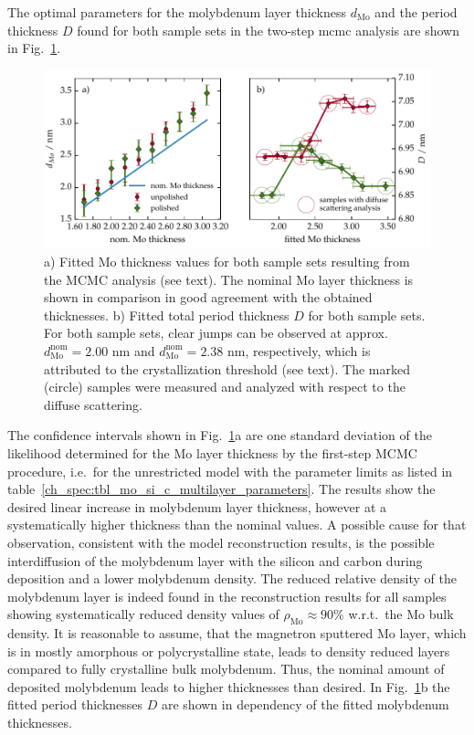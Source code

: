 The optimal parameters for the molybdenum layer thickness $d_\text{Mo}$ and the period thickness $D$ found for both sample sets in the two-step \gls{mcmc} analysis are shown in Fig.~\ref{ch_spec:fig_MoSi_fitted_mo_and_fitted_D}.
\begin{figure}[htbp]
\centering
\includegraphics[width=\textwidth]{img/fitted_mo_and_fitted_D}
\caption[Fitted Mo and period thickness values for both Mo/Si/C sample sets.]{a) Fitted Mo thickness values for both sample sets resulting from the MCMC analysis (see text). The nominal Mo layer thickness is shown in comparison in good agreement with the obtained thicknesses. b) Fitted total period thickness $D$ for both sample sets. For both sample sets, clear jumps can be observed at approx.~$d^\text{nom}_\text{Mo} =2.00$ nm and $d^\text{nom}_\text{Mo} =2.38$ nm, respectively, which is attributed to the crystallization threshold (see text). The marked (circle) samples were measured and analyzed with respect to the diffuse scattering.}
\label{ch_spec:fig_MoSi_fitted_mo_and_fitted_D}
\end{figure}
The confidence intervals shown in Fig.~\ref{ch_spec:fig_MoSi_fitted_mo_and_fitted_D}a are one standard deviation of the likelihood determined for the Mo layer thickness by the first-step MCMC procedure, i.e.~for the unrestricted model with the parameter limits as listed in table~\ref{ch_spec:tbl_mo_si_c_multilayer_parameters}. The results show the desired linear increase in molybdenum layer thickness, however at a systematically higher thickness than the nominal values. A possible cause for that observation, consistent with the model reconstruction results, is the possible interdiffusion of the molybdenum layer with the silicon and carbon during deposition and a lower molybdenum density. The reduced relative density of the molybdenum layer is indeed found in the reconstruction results for all samples showing systematically reduced density values of $\rho_\text{Mo} \approx 90\%$ w.r.t.~the Mo bulk density. It is reasonable to assume, that the magnetron sputtered Mo layer, which is in mostly amorphous or polycrystalline state, leads to density reduced layers compared to fully crystalline bulk molybdenum. Thus, the nominal amount of deposited molybdenum leads to higher thicknesses than desired. In Fig.~\ref{ch_spec:fig_MoSi_fitted_mo_and_fitted_D}b the fitted period thicknesses $D$ are shown in dependency of the fitted molybdenum thicknesses.

